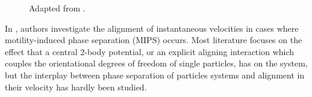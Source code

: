 \documentclass[../../master_thesis_np.tex]{subfiles}
\begin{document}
\begin{figure}[htp]
		 
		 \caption{Adapted from \cite{martin-gomez_collective_2018}.}
		 \label{fig:martin_flocking3}
	\end{figure}
	
	In \cite{caprini_spontaneous_2020}, authors investigate the alignment of instantaneous velocities in cases where motility-induced phase separation (MIPS) occurs. 
	Most literature focuses on the effect that a central 2-body potential, or an explicit aligning interaction which couples the orientational degrees of freedom of single particles, has on the system, but the interplay between phase separation of particles systems and alignment in their velocity has hardly been studied.
	
\end{document}
